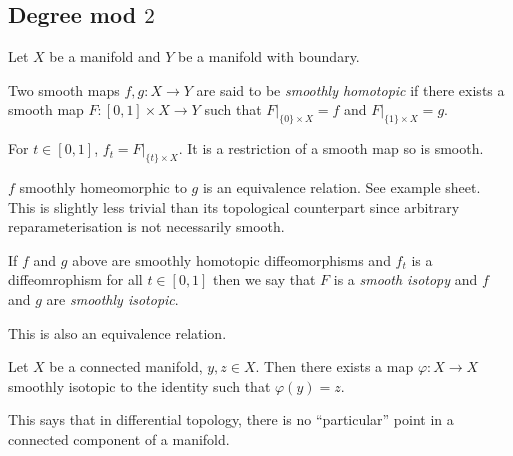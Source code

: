 \documentclass[a4paper]{article}
\begin{document}
\subsection{Degree mod \(2\)}

Let \(X\) be a manifold and \(Y\) be a manifold with boundary.

\begin{definition}
  Two smooth maps \(f, g: X \to Y\) are said to be \emph{smoothly homotopic} if there exists a smooth map \(F: [0, 1] \times X \to Y\) such that \(F|_{\{0\} \times X} = f\) and \(F|_{\{1\} \times X} = g\).
\end{definition}

\begin{notation}
  For \(t \in [0, 1]\), \(f_t = F|_{\{t\} \times X}\). It is a restriction of a smooth map so is smooth.
\end{notation}

\begin{remark}
  \(f\) smoothly homeomorphic to \(g\) is an equivalence relation. See example sheet. This is slightly less trivial than its topological counterpart since arbitrary reparameterisation is not necessarily smooth.
\end{remark}

\begin{definition}
  If \(f\) and \(g\) above are smoothly homotopic diffeomorphisms and \(f_t\) is a diffeomrophism for all \(t \in [0, 1]\) then we say that \(F\) is a \emph{smooth isotopy} and \(f\) and \(g\) are \emph{smoothly isotopic}.
\end{definition}

\begin{remark}
  This is also an equivalence relation.
\end{remark}

\begin{lemma}
  Let \(X\) be a connected manifold, \(y, z \in X\). Then there exists a map \(\varphi: X \to X\) smoothly isotopic to the identity such that \(\varphi(y) = z\).
\end{lemma}

This says that in differential topology, there is no ``particular'' point in a connected component of a manifold.
\end{document}
